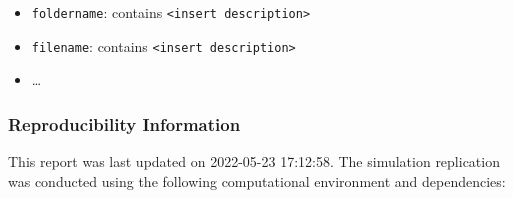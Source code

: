 \documentclass[10,a4paperpaper,]{article}
\begin{document}
\begin{itemize}
\tightlist
\item
  \texttt{foldername}: contains
  \texttt{\textless{}insert\ description\textgreater{}}
\item
  \texttt{filename}: contains
  \texttt{\textless{}insert\ description\textgreater{}}
\item
  \ldots{}
\end{itemize}

\subsubsection*{Reproducibility Information}

This report was last updated on 2022-05-23 17:12:58. The simulation
replication was conducted using the following computational environment
and dependencies:

\FloatBarrier
\end{document}
